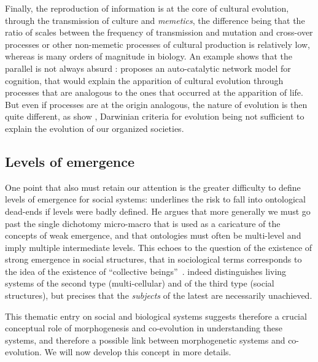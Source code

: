 \documentclass[letterpaper]{article}
\begin{document}
Finally, the reproduction of information is at the core of cultural evolution, through the transmission of culture and \emph{memetics}, the difference being that the ratio of scales between the frequency of transmission and mutation and cross-over processes or other non-memetic processes of cultural production is relatively low, whereas is many orders of magnitude in biology. An example shows that the parallel is not always absurd : \cite{2017arXiv170305917G} proposes an auto-catalytic network model for cognition, that would explain the apparition of cultural evolution through processes that are analogous to the ones that occurred at the apparition of life. %
But even if processes are at the origin analogous, the nature of evolution is then quite different, as show \cite{vanderLeeuw2009}, Darwinian criteria for evolution being not sufficient to explain the evolution of our organized societies.

\subsection{Levels of emergence}

One point that also must retain our attention is the greater difficulty to define levels of emergence for social systems: \cite{roth2009reconstruction} underlines the risk to fall into ontological dead-ends if levels were badly defined. He argues that more generally we must go past the single dichotomy micro-macro that is used as a caricature of the concepts of weak emergence, and that ontologies must often be multi-level and imply multiple intermediate levels. This echoes to the question of the existence of strong emergence in social structures, that in sociological terms corresponds to the idea of the existence of ``collective beings''~\citep{angeletti2015etres}. \cite{morin1980methode} indeed distinguishes living systems of the second type (multi-cellular) and of the third type (social structures), but precises that the \emph{subjects} of the latest are necessarily unachieved.

\medskip

This thematic entry on social and biological systems suggests therefore a crucial conceptual role of morphogenesis and co-evolution in understanding these systems, and therefore a possible link between morphogenetic systems and co-evolution. We will now develop this concept in more details.
\end{document}
